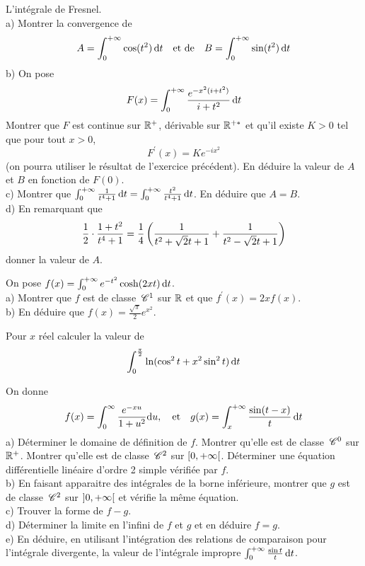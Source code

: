 \begin{exercice}
L'intégrale de Fresnel. \\
a) Montrer la convergence de
$$ A=\int_{0}^{+\infty}\cos(t^{2})\,\mathrm{d}t \quad \text{et de} \quad B=\int_{0}^{+\infty}\sin(t^{2})\,\mathrm{d}t $$
b) On pose
$$ F(x)=\int_{0}^{+\infty}\frac{e^{-x^{2}(i+t^{2})}}{i+t^{2}}\,\mathrm{d}t $$
Montrer que $F$ est continue sur $\mathbb{R}^{+}$, dérivable sur $\mathbb{R}^{+*}$ et qu'il existe $K>0$ tel que pour tout $x>0$,
$$ F^{\prime}(x)=Ke^{-ix^{2}} $$
(on pourra utiliser le résultat de l'exercice précédent).
En déduire la valeur de $A$ et $B$ en fonction de $F(0)$. \\
c) Montrer que $\int_{0}^{+\infty}\frac{1}{t^{4}+1}\,\mathrm{d}t = \int_{0}^{+\infty}\frac{t^{2}}{t^{4}+1}\,\mathrm{d}t$. En déduire que $A=B$. \\
d) En remarquant que
$$ \frac{1}{2}\cdot\frac{1+t^{2}}{t^{4}+1}=\frac{1}{4}\left(\frac{1}{t^{2}+\sqrt{2}t+1}+\frac{1}{t^{2}-\sqrt{2}t+1}\right) $$
donner la valeur de $A$.
\end{exercice}

\begin{exercice}
On pose $f(x)=\int_{0}^{+\infty}e^{-t^{2}}\cosh(2xt)\,\mathrm{d}t$. \\
a) Montrer que $f$ est de classe $\,\mathscr C^{1}$ sur $\mathbb{R}$ et que $f^{\prime}(x)=2xf(x)$. \\
b) En déduire que $f(x)=\frac{\sqrt{\pi}}{2}e^{x^{2}}$.
\end{exercice}

\begin{exercice}
Pour $x$ réel calculer la valeur de
$$ \int_{0}^{\frac{\pi}{2}}\ln(\cos^{2}t+x^{2}\sin^{2}t)\,\mathrm{d}t $$
\end{exercice}

\begin{exercice}
On donne
$$ f(x)=\int_{0}^{\infty}\frac{e^{-xu}}{1+u^{2}}\mathrm{d}u, \quad \text{et} \quad g(x)=\int_{x}^{+\infty}\frac{\sin(t-x)}{t}\,\mathrm{d}t $$
a) Déterminer le domaine de définition de $f$. Montrer qu'elle est de classe $\,\mathscr C^{0}$ sur $\mathbb{R}^{+}$. Montrer qu'elle est de classe $\,\mathscr C^{2}$ sur $\left[0, +\infty\right[$. Déterminer une équation différentielle linéaire d'ordre 2 simple vérifiée par $f$. \\
b) En faisant apparaitre des intégrales de la borne inférieure, montrer que $g$ est de classe $\,\mathscr C^{2}$ sur $\left]0, +\infty\right[$ et vérifie la même équation. \\
c) Trouver la forme de $f-g$. \\
d) Déterminer la limite en l'infini de $f$ et $g$ et en déduire $f=g$. \\
e) En déduire, en utilisant l'intégration des relations de comparaison pour l'intégrale divergente, la valeur de l'intégrale impropre $\int_{0}^{+\infty}\frac{\sin t}{t}\,\mathrm{d}t$.
\end{exercice}

